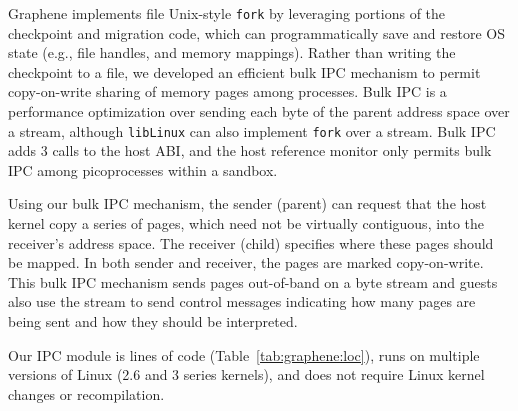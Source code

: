 Graphene implements file Unix-style {\tt fork}
by leveraging portions of the checkpoint and migration code,
which can programmatically save and restore OS state (e.g., file handles, and memory mappings).
Rather than writing the checkpoint to a file, 
we developed an efficient bulk IPC mechanism to 
permit copy-on-write sharing of memory pages among processes.
Bulk IPC is a performance optimization over sending each byte of the parent address
space over a stream, although {\tt libLinux} can also implement {\tt fork}
over a stream.
Bulk IPC adds 3 calls to the host ABI,
and the host reference monitor only permits bulk IPC among
picoprocesses within a sandbox.



Using our bulk IPC mechanism,
the sender (parent) can request that the host kernel copy
a series of pages, which need not be virtually contiguous,
into the receiver's address space.
The receiver (child) specifies where these pages should be mapped.
In both sender and receiver, the pages are marked copy-on-write.  
This bulk IPC mechanism sends pages out-of-band on a byte stream and guests also use the stream to send control messages 
indicating 
how many pages are being sent and how they should be interpreted.

Our IPC module is \gipclines{} lines of code (Table~\ref{tab:graphene:loc}), 
runs on multiple versions of Linux (2.6 and 3 series kernels), and
does not require
Linux kernel changes or recompilation.


\begin{comment}
A critical challenge in developing a Linux library OS was implementing 
handle inheritance in the guest.  In some cases, 
handles are easy to reproduce: an open file can simply be reopened in the child,
and the cursor offset adjusted (note that file handle offsets are a library abstraction
implemented over a memory mapped file).
Pipes, however, are not easily recreated without host support.
\end{comment}

